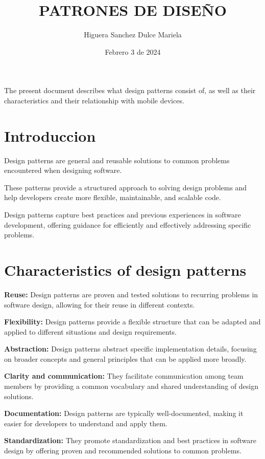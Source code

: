\documentclass{article}
\title{PATRONES DE DISEÑO}
\author{Higuera Sanchez Dulce Mariela}
\date{Febrero 3 de 2024}
\begin{document}
 
	
	\maketitle 
	The present document describes what design patterns consist of, as well as their characteristics and their relationship with mobile devices.
	
	\begin{multicols}{2}
		
		\section{Introduccion}
		Design patterns are general and reusable solutions to common problems encountered when designing software. 
		
		These patterns provide a structured approach to solving design problems and help developers create more flexible, maintainable, and scalable code. 
		
		Design patterns capture best practices and previous experiences in software development, offering guidance for efficiently and effectively addressing specific problems.
		
		\section{Characteristics of design patterns}

		\textbf{Reuse:} Design patterns are proven and tested solutions to recurring problems in software design, allowing for their reuse in different contexts.
		
		\textbf{Flexibility:} Design patterns provide a flexible structure that can be adapted and applied to different situations and design requirements.
		
		\textbf{Abstraction:} Design patterns abstract specific implementation details, focusing on broader concepts and general principles that can be applied more broadly.
		
		\textbf{Clarity and communication:} They facilitate communication among team members by providing a common vocabulary and shared understanding of design solutions.
		
		\textbf{Documentation:} Design patterns are typically well-documented, making it easier for developers to understand and apply them.
		
		\textbf{Standardization:} They promote standardization and best practices in software design by offering proven and recommended solutions to common problems.
		

\end{multicols}
\end{document}
